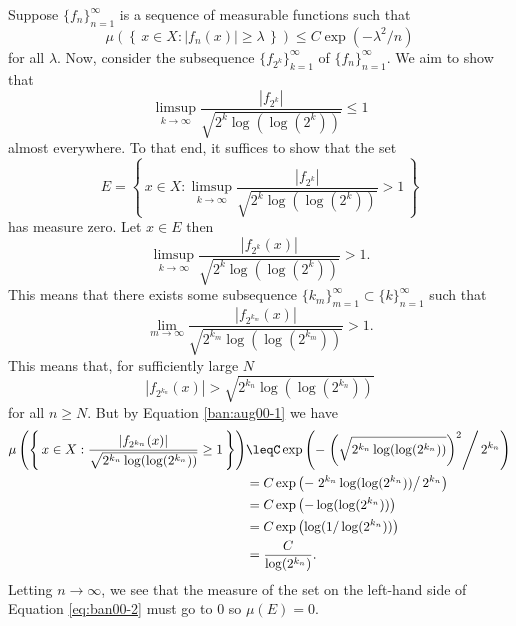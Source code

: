 \begin{solution}
  Suppose ${\{f_n\}}_{n=1}^\infty$ is a sequence of measurable functions
  such that
  \begin{equation}
    \label{ban:aug00-1}%
    \mu\left(\left\{\,x\in X:|f_n(x)|\geq\lambda\,\right\}\right)\leq C
    \exp(-\lambda^2/n)
  \end{equation}
    for all $\lambda$. Now, consider the subsequence
  ${\{f_{2^k}\}}_{k=1}^\infty$ of ${\{f_n\}}_{n=1}^\infty$. We aim to show
  that
  \[
    \limsup_{k\to\infty}\frac{|f_{2^k}|}{\sqrt{2^k\log(\log(2^k))}}\leq 1
  \]
  almost everywhere. To that end, it suffices to show that the set
  \[
    E=%
    \left\{\,%
      x\in
      X:\limsup_{k\to\infty}\frac{|f_{2^k}|}{\sqrt{2^k\log(\log(2^k))}}>1%
      \,%
    \right\}
  \]
  has measure zero. Let $x\in E$ then
  \[
    \limsup_{k\to\infty} \frac{|f_{2^k}(x)|}{\sqrt{2^k\log(\log(2^k))}}>1.
  \]
  This means that there exists some subsequence
  $\{k_m\}_{m=1}^\infty\subset\{k\}_{n=1}^\infty$ such that
  \[
    \lim_{m\to\infty}\frac{|f_{2^{k_m}}(x)|}{\sqrt{2^{k_m}\log(\log(2^{k_m}))}}>1.
  \]
  This means that, for sufficiently large $N$
  \[
    |f_{2^{k_n}}(x)|>\sqrt{2^{k_n}\log(\log(2^{k_n}))}
  \]
  for all $n\geq N$. But by Equation \eqref{ban:aug00-1} we have
  \begin{equation}
    \label{eq:ban00-2}
    \begin{aligned}
      \mu\left(\left\{\,%
          x\in
          X:\frac{|f_{2^{k_n}}(x)|}{\sqrt{2^{k_n}\log(\log(2^{k_n}))}}\geq
          1 \,\right\}\right) &\leq%
      C\exp\left(-\left.
          \left(\sqrt{2^{k_n}\log(\log(2^{k_n}))}\right)^2\right/2^{k_n}%
      \right)\\
      &=C\exp\left(-\left.2^{k_n}\log(\log(2^{k_n}))\right/2^{k_n} \right)\\
      &=C\exp\left(-\log(\log(2^{k_n}))\right)\\
      &=C\exp\left(\log(1/\log(2^{k_n}))\right)\\
      &=\frac{C}{\log(2^{k_n})}.
    \end{aligned}
  \end{equation}
  Letting $n\to\infty$, we see that the measure of the set on the left-hand
  side of Equation \eqref{eq:ban00-2} must go to $0$ so $\mu(E)=0$.
\end{solution}


